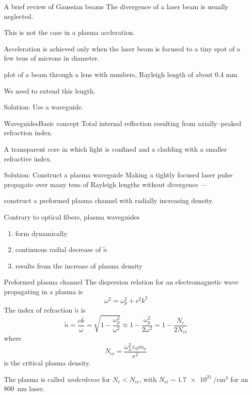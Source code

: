 \documentclass[final]{beamer}
\begin{document}
  \begin{frame}{A brief review of Gaussian beams}
    The divergence of a laser beam is usually neglected.

    This is not the case in a plasma accleration.
    
    Acceleration is achieved only when the laser beam is focused to a tiny spot of a few tens of microns in diameter.

    \begin{center}
      plot of a beam through a lens with numbers, Rayleigh length of about 0.4 mm.
    \end{center}
    We need to extend this length.

    Solution: Use a waveguide.
  \end{frame}
  \begin{frame}{Waveguides}{Basic concept}
   Total internal reflection resulting from axially--peaked refraction index.

   A transparent core in which light is confined and a cladding with a smaller refractive index.
  \end{frame}
  \begin{frame}{Solution: Construct a plasma waveguide}
    Making a tightly focused laser pulse propagate over many tens of Rayleigh lengths without divergence ---

    construct a preformed plasma channel with radially increasing density.

    Contrary to optical fibers, plasma waveguides
    \begin{enumerate}
      \item form dynamically
      \item continuous radial decrease of $\tilde n$
      \item results from the increase of plasma density
    \end{enumerate}
  \end{frame}
  \begin{frame}{Preformed plasma channel}
  The dispersion relation for an electromagnetic wave propagating in a plasma is
  \begin{equation}
    \omega^2=\omega_p^2+c^2k^2
  \end{equation}
  The index of refraction $\tilde n$ is
  \begin{equation}
    \tilde{n}=\frac{c k}{\omega}=\sqrt{1-\frac{\omega_p^2}{\omega^2}}\approx1-\frac{\omega_p^2}{2\omega^2}=1-\frac{N_e}{2N_\text{cr}}
  \end{equation}
  where
    \begin{equation}
        N_\text{cr}=\frac{\omega_L^2\varepsilon_0 m_e}{e^2}
    \end{equation}
    is the critical plasma density.

    The plasma is called \textit{underdense} for $N_e < N_\text{cr}$, with $N_\text{cr}\sim\SI{1.7e21}{\per\cubic\cm}$ for an \SI{800}{\nm} laser.
\end{frame}
\end{document}

